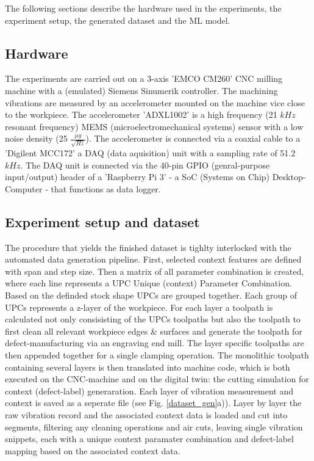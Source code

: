 \documentclass[5p,times,procedia]{elsarticle}
\begin{document}
The following sections describe the hardware used in the experiments, the experiment setup, the generated dataset and the ML model.

\subsection{Hardware}
\vspace*{-\baselineskip}
The experiments are carried out on a 3-axis 'EMCO CM260' CNC milling machine with a (emulated) Siemens Sinumerik controller. The machining vibrations are measured by an accelerometer mounted on the machine vice close to the workpiece. The accelerometer 'ADXL1002' is a high frequency (21 $kHz$ resonant frequency) MEMS (microelectromechanical systems) sensor with a low noise density (25 $\frac{\mu g}{\sqrt{Hz}}$). The accelerometer is connected via a coaxial cable to a 'Digilent MCC172' a DAQ (data aquisition) unit with a sampling rate of 51.2 $kHz$.
The DAQ unit is connected via the 40-pin GPIO (genral-purpose input/output) header of a 'Raspberry Pi 3' - a SoC (Systems on Chip) Desktop-Computer - that functions as data logger.







\subsection{Experiment setup and dataset}
\vspace*{-\baselineskip}
The procedure that yields the finished dataset is tighlty interlocked with the automated data generation pipeline.
First, selected context features are defined with span and step size. Then a matrix of all parameter combination is created, where each line represents a UPC Unique (context) Parameter Combination. 
Based on the definded stock shape UPCs are grouped together. Each group of UPCs represents a z-layer of the workpiece. For each layer a toolpath is calculated not only consisisting of the UPCs toolpaths but also the toolpath to first clean all relevant workpiece edges \& surfaces and generate the toolpath for defect-manufacturing via an engraving end mill.
The layer specific toolpaths are then appended together for a single clamping operation.
The monolithic toolpath containing several layers is then translated into machine code, which is both executed on the CNC-machine and on the digital twin: the cutting simulation for context (defect-label) generaration. Each layer of vibration measurement and context is saved as a seperate file (see Fig. \ref{dataset_gen}a)).
Layer by layer the raw vibration record and the associated context data is loaded and cut into segments, filtering any cleaning operations and air cuts, leaving single vibration snippets, each with a unique context paramater combination and defect-label mapping based on the associated context data.
\end{document}

